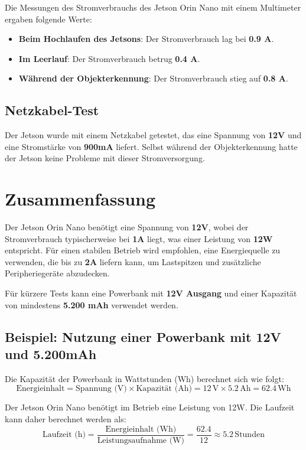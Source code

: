 \documentclass[12pt]{article}
\begin{document}
\begin{itemize}
Die Messungen des Stromverbrauchs des Jetson Orin Nano mit einem Multimeter 
ergaben folgende Werte:
\begin{itemize}
    \item \textbf{Beim Hochlaufen des Jetsons}: Der Stromverbrauch lag bei \textbf{0.9 A}.
    \item \textbf{Im Leerlauf}: Der Stromverbrauch betrug \textbf{0.4 A}.
    \item \textbf{Während der Objekterkennung}: Der Stromverbrauch stieg auf \textbf{0.8 A}.
\end{itemize}

\subsection*{Netzkabel-Test}

Der Jetson wurde mit einem Netzkabel getestet, das eine Spannung von \textbf{12V} und 
eine Stromstärke von \textbf{900mA} liefert. 
Selbst während der Objekterkennung hatte der Jetson keine Probleme mit dieser 
Stromversorgung.

    \end{itemize}
    \section{Zusammenfassung}

    Der Jetson Orin Nano benötigt eine Spannung von \textbf{12V}, wobei der 
    Stromverbrauch typischerweise bei \textbf{1A} liegt, was einer Leistung 
    von \textbf{12W} entspricht. Für einen stabilen Betrieb wird empfohlen, eine
    Energiequelle zu verwenden, die bis zu \textbf{2A} liefern kann, um Lastspitzen und 
    zusätzliche Peripheriegeräte abzudecken.
    
    Für kürzere Tests kann eine Powerbank mit \textbf{12V Ausgang} und einer 
    Kapazität von mindestens \textbf{5.200 mAh} verwendet werden. 
    
    \subsection*{Beispiel: Nutzung einer Powerbank mit 12V und 5.200mAh}
    
    Die Kapazität der Powerbank in Wattstunden (Wh) berechnet sich wie folgt:
    \[
    \text{Energieinhalt} = \text{Spannung (V)} \times \text{Kapazität (Ah)} = 12 \, \text{V} \times 5.2 \, \text{Ah} = 62.4 \, \text{Wh}
    \]
    
    Der Jetson Orin Nano benötigt im Betrieb eine Leistung von 12W. Die Laufzeit kann 
    \indent daher berechnet werden als:
    \[
    \text{Laufzeit (h)} = \frac{\text{Energieinhalt (Wh)}}{\text{Leistungsaufnahme (W)}} = \frac{62.4}{12} \approx 5.2 \, \text{Stunden}
    \]
    
\end{document}
